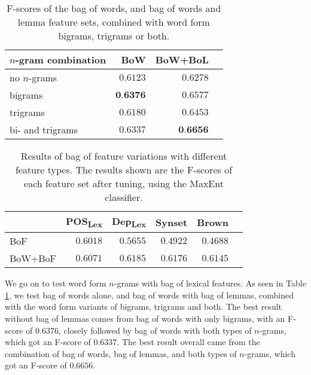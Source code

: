 \documentclass[11pt,letterpaper]{article}
\begin{document}
\begin{table}
  \begin{center}
    \begin{tabular}{lrrr}
      \toprule
      
      $n$-gram combination & BoW & BoW+BoL \\
      \midrule
      no $n$-grams & $0.6123$ & $0.6278$ \\
      bigrams & $\textbf{0.6376}$ & $0.6577$ \\
      trigrams & $0.6180$ & $0.6453$ \\
      bi- and trigrams & $0.6337$ & $\textbf{0.6656}$ \\
      \bottomrule

    \end{tabular}
  \end{center}
  \caption{F-scores of the bag of words, and bag of words and lemma feature sets, combined with word form bigrams, trigrams or both.}
  \label{tab:ngrams}
\end{table}

\begin{table}
  \begin{center}
    \begin{tabular}{lrrrrr}
      \toprule
      
     & POS\textsubscript{Lex} & Dep\textsubscript{Lex} & Synset & Brown\\ %
      \midrule
      BoF & $0.6018$ & $0.5655$ & $0.4922$ & $0.4688$ \\ %
      BoW+BoF & $0.6071$ & $0.6185$ & $0.6176$ & $0.6145$\\ %
      
      \bottomrule

    \end{tabular}
  \end{center}
  \caption{Results of bag of feature variations with different feature types. The results shown are the F-scores of each feature set after tuning, using the MaxEnt classifier.}
  \label{tab:bagOfFeatures}
\end{table}



We go on to test word form $n$-grams with bag of lexical features. As seen in Table \ref{tab:ngrams}, we test bag of words alone, and bag of words with bag of lemmas, combined with the word form variants of bigrams, trigrams and both. The best result without bag of lemmas comes from bag of words with only bigrams, with an F-score of $0.6376$, closely followed by bag of words with both types of $n$-grams, which got an F-score of $0.6337$. The best result overall came from the combination of bag of words, bag of lemmas, and both types of $n$-grams, which got an F-score of $0.6656$.
\end{document}
